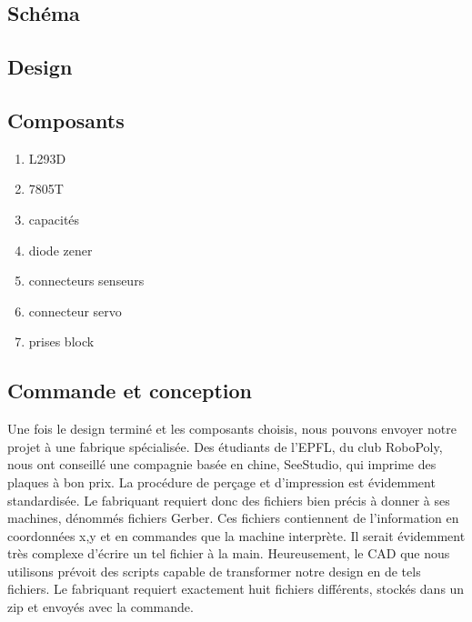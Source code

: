\documentclass[a4paper,11pt]{report}
\begin{document}
{%
\subsection{Schéma}
\subsection{Design}
\subsection{Composants}
\begin{enumerate}
\item L293D
\item 7805T
\item capacités
\item diode zener
\item connecteurs senseurs
\item connecteur servo
\item prises block
\end{enumerate}
\subsection{Commande et conception}
Une fois le design terminé et les composants choisis, nous pouvons envoyer
notre projet à une fabrique spécialisée. Des étudiants de l'EPFL, du club
RoboPoly, nous ont conseillé une compagnie basée en chine, SeeStudio, qui imprime des
plaques à bon prix. La procédure de perçage et d'impression est évidemment
standardisée. Le fabriquant requiert donc des fichiers bien précis à donner à
ses machines, dénommés fichiers Gerber. Ces fichiers contiennent de
l'information en coordonnées x,y et en commandes que la machine interprète. Il
serait évidemment très complexe d'écrire un tel fichier à la
main. Heureusement, le CAD que nous utilisons prévoit des scripts capable de
transformer notre design en de tels fichiers. Le fabriquant requiert
exactement huit fichiers différents, stockés dans un zip et envoyés avec la commande.  

}
\end{document}
